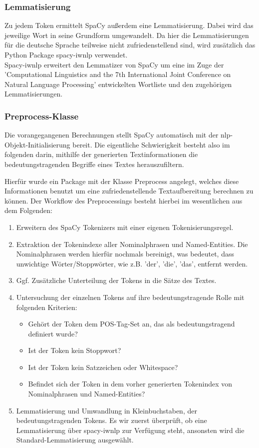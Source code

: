 \subsubsection{Lemmatisierung}
Zu jedem Token ermittelt SpaCy außerdem eine Lemmatisierung. Dabei wird das jeweilige Wort in seine Grundform umgewandelt. Da hier die Lemmatisierungen für die deutsche Sprache teilweise nicht zufriedenstellend sind, wird zusätzlich das Python Package spacy-iwnlp verwendet. 
\\Spacy-iwnlp erweitert den Lemmatizer von SpaCy um eine im Zuge der 'Computational Linguistics and the 7th International Joint Conference on Natural Language Processing' entwickelten Wortliste und den zugehörigen Lemmatisierungen. 

\subsubsection{Preprocess-Klasse}
Die vorangegangenen Berechnungen stellt SpaCy automatisch mit der nlp-Objekt-Initialisierung bereit. Die eigentliche Schwierigkeit besteht also im folgenden darin, mithilfe der generierten Textinformationen die bedeutungstragenden Begriffe eines Textes herauszufiltern.

Hierfür wurde ein Package mit der Klasse Preprocess angelegt, welches diese Informationen benutzt um eine zufriedenstellende Textaufbereitung berechnen zu können.
Der Workflow des Preprocessings besteht hierbei im wesentlichen aus dem Folgenden:
\begin{enumerate}
\item Erweitern des SpaCy Tokenizers mit einer eigenen Tokenisierungsregel.
\item Extraktion der Tokenindexe aller Nominalphrasen und Named-Entities. Die Nominalphrasen werden hierfür nochmals bereinigt, was bedeutet, dass unwichtige Wörter/Stoppwörter, wie z.B. 'der', 'die', 'das', entfernt werden.
\item Ggf. Zusätzliche Unterteilung der Tokens in die Sätze des Textes.
\item Untersuchung der einzelnen Tokens auf ihre bedeutungstragende Rolle mit folgenden Kriterien:
\begin{itemize}
\item Gehört der Token dem POS-Tag-Set an, das als bedeutungstragend definiert wurde?
\item Ist der Token kein Stoppwort?
\item Ist der Token kein Satzzeichen oder Whitespace?
\item Befindet sich der Token in dem vorher generierten Tokenindex von Nominalphrasen und Named-Entities?
\end{itemize}
\item Lemmatisierung und Umwandlung in Kleinbuchstaben, der bedeutungstragenden Tokens. Es wir zuerst überprüft, ob eine Lemmatisierung über spacy-iwnlp zur Verfügung steht, ansonsten wird die Standard-Lemmatisierung ausgewählt.
\end{enumerate}

